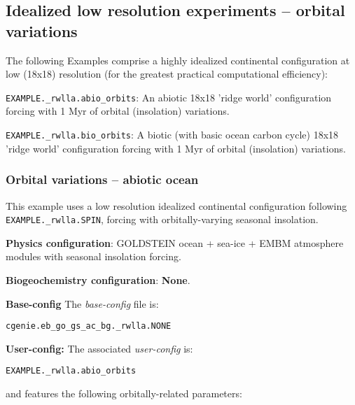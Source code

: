 \documentclass[10pt,twoside]{article}
\begin{document}
\subsection{Idealized low resolution experiments -- orbital variations}

The following Examples comprise a highly idealized continental configuration at low (18x18) resolution (for the greatest practical computational efficiency):

        \begin{compactenum}
                        
                \item \texttt{EXAMPLE.\_rwlla.abio\_orbits}: An abiotic 18x18 'ridge world' configuration forcing with 1 Myr of orbital (insolation) variations.
                        
                \item \texttt{EXAMPLE.\_rwlla.bio\_orbits}: A biotic (with basic ocean carbon cycle) 18x18 'ridge world' configuration forcing with 1 Myr of orbital (insolation) variations.
                                
        \end{compactenum}


\subsubsection{Orbital variations -- abiotic ocean}\label{EXAMPLE.rwlla.abioorbits}

This example uses a low resolution idealized continental configuration following \texttt{EXAMPLE.\_rwlla.SPIN}, forcing with orbitally-varying seasonal insolation.

\noindent \textbf{Physics configuration}: GOLDSTEIN ocean + sea-ice + EMBM atmosphere modules with seasonal insolation forcing.

\noindent \textbf{Biogeochemistry configuration}: \textbf{None}.

\noindent \textbf{Base-config} The \textit{base-config} file is:
\vspace{-10pt}\begin{verbatim}cgenie.eb_go_gs_ac_bg._rwlla.NONE\end{verbatim}\vspace{-10pt}

\noindent \textbf{User-config:} The associated \textit{user-config} is:
\vspace{-10pt}\begin{verbatim}EXAMPLE._rwlla.abio_orbits\end{verbatim}\vspace{-10pt}
and features the following orbitally-related parameters:
\end{document}
